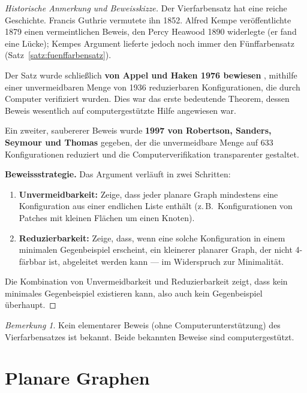 \documentclass[12pt,a4paper]{amsart}
\theoremstyle{definition}
\theoremstyle{remark}
\newtheorem{remark}[theorem]{Bemerkung}
\begin{document}
\begin{proof}[Historische Anmerkung und Beweisskizze]
Der Vierfarbensatz hat eine reiche Geschichte. Francis Guthrie vermutete
ihn 1852. Alfred Kempe veröffentlichte 1879 einen vermeintlichen Beweis,
den Percy Heawood 1890 widerlegte (er fand eine Lücke); Kempes Argument
lieferte jedoch noch immer den Fünffarbensatz
(Satz~\ref{satz:fuenffarbensatz}).

Der Satz wurde schließlich \textbf{von Appel und Haken 1976 bewiesen}
\cite{appelhaken1977}, mithilfe einer unvermeidbaren Menge von 1936
reduzierbaren Konfigurationen, die durch Computer verifiziert wurden. Dies
war das erste bedeutende Theorem, dessen Beweis wesentlich auf
computergestützte Hilfe angewiesen war.

Ein zweiter, saubererer Beweis wurde \textbf{1997 von Robertson, Sanders,
Seymour und Thomas} \cite{robertson1997} gegeben, der die unvermeidbare
Menge auf 633 Konfigurationen reduziert und die Computerverifikation
transparenter gestaltet.

\textbf{Beweissstrategie.} Das Argument verläuft in zwei Schritten:
\begin{enumerate}
  \item \textbf{Unvermeidbarkeit:} Zeige, dass jeder planare Graph mindestens
        eine Konfiguration aus einer endlichen Liste enthält (z.\,B.\
        Konfigurationen von Patches mit kleinen Flächen um einen Knoten).
  \item \textbf{Reduzierbarkeit:} Zeige, dass, wenn eine solche Konfiguration
        in einem minimalen Gegenbeispiel erscheint, ein kleinerer planarer
        Graph, der nicht 4-färbbar ist, abgeleitet werden kann ---
        im Widerspruch zur Minimalität.
\end{enumerate}
Die Kombination von Unvermeidbarkeit und Reduzierbarkeit zeigt, dass kein
minimales Gegenbeispiel existieren kann, also auch kein Gegenbeispiel
überhaupt.
\end{proof}

\begin{remark}
Kein elementarer Beweis (ohne Computerunterstützung) des Vierfarbensatzes
ist bekannt. Beide bekannten Beweise sind computergestützt.
\end{remark}

\section{Planare Graphen}
\label{sec:planar}
\end{document}
